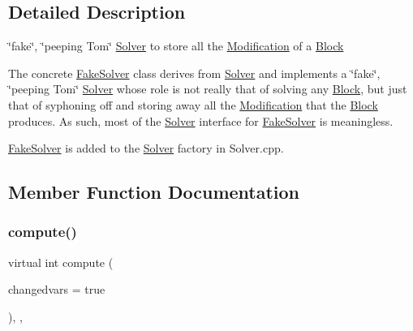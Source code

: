 \subsection{Detailed Description}
\char`\"{}fake\char`\"{}, \char`\"{}peeping Tom\char`\"{} \mbox{\hyperlink{class_s_m_spp__di__unipi__it_1_1_solver}{Solver}} to store all the \mbox{\hyperlink{class_s_m_spp__di__unipi__it_1_1_modification}{Modification}} of a \mbox{\hyperlink{class_s_m_spp__di__unipi__it_1_1_block}{Block}} 

The concrete \mbox{\hyperlink{class_s_m_spp__di__unipi__it_1_1_fake_solver}{Fake\+Solver}} class derives from \mbox{\hyperlink{class_s_m_spp__di__unipi__it_1_1_solver}{Solver}} and implements a \char`\"{}fake\char`\"{}, \char`\"{}peeping Tom\char`\"{} \mbox{\hyperlink{class_s_m_spp__di__unipi__it_1_1_solver}{Solver}} whose role is not really that of solving any \mbox{\hyperlink{class_s_m_spp__di__unipi__it_1_1_block}{Block}}, but just that of syphoning off and storing away all the \mbox{\hyperlink{class_s_m_spp__di__unipi__it_1_1_modification}{Modification}} that the \mbox{\hyperlink{class_s_m_spp__di__unipi__it_1_1_block}{Block}} produces. As such, most of the \mbox{\hyperlink{class_s_m_spp__di__unipi__it_1_1_solver}{Solver}} interface for \mbox{\hyperlink{class_s_m_spp__di__unipi__it_1_1_fake_solver}{Fake\+Solver}} is meaningless.

\mbox{\hyperlink{class_s_m_spp__di__unipi__it_1_1_fake_solver}{Fake\+Solver}} is added to the \mbox{\hyperlink{class_s_m_spp__di__unipi__it_1_1_solver}{Solver}} factory in Solver.\+cpp. 

\subsection{Member Function Documentation}
\mbox{\label{class_s_m_spp__di__unipi__it_1_1_fake_solver_afc8ff54ab05d22f4cca0fb0bfbeb7a49}} 
\subsubsection{\texorpdfstring{compute()}{compute()}}
{\footnotesize\ttfamily virtual int compute (\begin{DoxyParamCaption}\item[{bool}]{changedvars = {\ttfamily true} }\end{DoxyParamCaption})\hspace{0.3cm}{\ttfamily [inline]}, {\ttfamily [override]}, {\ttfamily [virtual]}}



